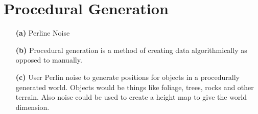 \documentclass{article}
\begin{document}
\section{Procedural Generation}

\begin{itemize}
    \item[\textbf{(a)}] Perline Noise
    \item[\textbf{(b)}] Procedural generation is a method of creating data algorithmically as opposed to manually.
    \item[\textbf{(c)}] User Perlin noise to generate positions for objects in a procedurally generated world. Objects
        would be things like foliage, trees, rocks and other terrain. Also noise could be used to create a height map to give the
        world dimension.
\end{itemize}
\end{document}

